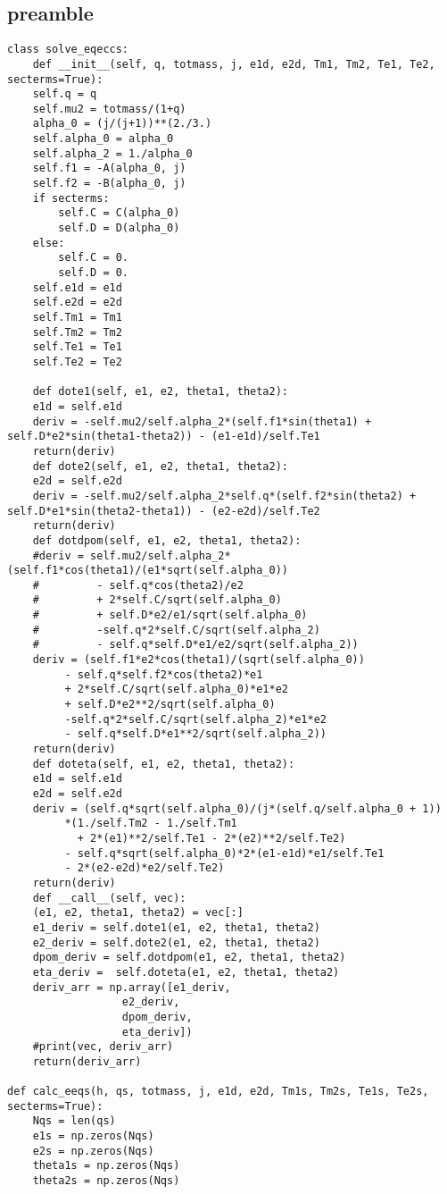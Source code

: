 \documentclass[11pt]{article}
\begin{document}
\subsection{preamble}
\label{sec:org083e996}
\begin{verbatim}
class solve_eqeccs:
    def __init__(self, q, totmass, j, e1d, e2d, Tm1, Tm2, Te1, Te2, secterms=True):
	self.q = q
	self.mu2 = totmass/(1+q)
	alpha_0 = (j/(j+1))**(2./3.)
	self.alpha_0 = alpha_0
	self.alpha_2 = 1./alpha_0
	self.f1 = -A(alpha_0, j)
	self.f2 = -B(alpha_0, j)
	if secterms:
	    self.C = C(alpha_0)
	    self.D = D(alpha_0)
	else:
	    self.C = 0.
	    self.D = 0.
	self.e1d = e1d
	self.e2d = e2d
	self.Tm1 = Tm1
	self.Tm2 = Tm2
	self.Te1 = Te1
	self.Te2 = Te2

    def dote1(self, e1, e2, theta1, theta2):
	e1d = self.e1d
	deriv = -self.mu2/self.alpha_2*(self.f1*sin(theta1) + self.D*e2*sin(theta1-theta2)) - (e1-e1d)/self.Te1
	return(deriv)
    def dote2(self, e1, e2, theta1, theta2):
	e2d = self.e2d
	deriv = -self.mu2/self.alpha_2*self.q*(self.f2*sin(theta2) + self.D*e1*sin(theta2-theta1)) - (e2-e2d)/self.Te2
	return(deriv)
    def dotdpom(self, e1, e2, theta1, theta2):
	#deriv = self.mu2/self.alpha_2*(self.f1*cos(theta1)/(e1*sqrt(self.alpha_0))
	#         - self.q*cos(theta2)/e2
	#         + 2*self.C/sqrt(self.alpha_0)
	#         + self.D*e2/e1/sqrt(self.alpha_0)
	#         -self.q*2*self.C/sqrt(self.alpha_2)
	#         - self.q*self.D*e1/e2/sqrt(self.alpha_2))
	deriv = (self.f1*e2*cos(theta1)/(sqrt(self.alpha_0))
		 - self.q*self.f2*cos(theta2)*e1
		 + 2*self.C/sqrt(self.alpha_0)*e1*e2
		 + self.D*e2**2/sqrt(self.alpha_0)
		 -self.q*2*self.C/sqrt(self.alpha_2)*e1*e2
		 - self.q*self.D*e1**2/sqrt(self.alpha_2))
	return(deriv)
    def doteta(self, e1, e2, theta1, theta2):
	e1d = self.e1d
	e2d = self.e2d
	deriv = (self.q*sqrt(self.alpha_0)/(j*(self.q/self.alpha_0 + 1))
		 *(1./self.Tm2 - 1./self.Tm1
		   + 2*(e1)**2/self.Te1 - 2*(e2)**2/self.Te2)
		 - self.q*sqrt(self.alpha_0)*2*(e1-e1d)*e1/self.Te1
		 - 2*(e2-e2d)*e2/self.Te2)
	return(deriv)
    def __call__(self, vec):
	(e1, e2, theta1, theta2) = vec[:]
	e1_deriv = self.dote1(e1, e2, theta1, theta2)
	e2_deriv = self.dote2(e1, e2, theta1, theta2)
	dpom_deriv = self.dotdpom(e1, e2, theta1, theta2)
	eta_deriv =  self.doteta(e1, e2, theta1, theta2)
	deriv_arr = np.array([e1_deriv,
			      e2_deriv,
			      dpom_deriv,
			      eta_deriv])
	#print(vec, deriv_arr)
	return(deriv_arr)

def calc_eeqs(h, qs, totmass, j, e1d, e2d, Tm1s, Tm2s, Te1s, Te2s, secterms=True):
    Nqs = len(qs)
    e1s = np.zeros(Nqs)
    e2s = np.zeros(Nqs)
    theta1s = np.zeros(Nqs)
    theta2s = np.zeros(Nqs)


\end{verbatim}
\end{document}
